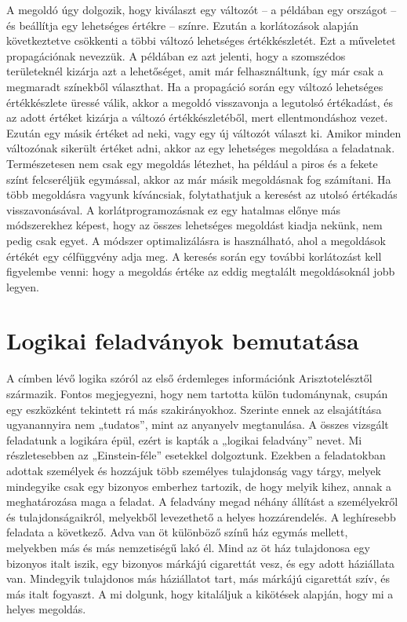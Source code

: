 \documentclass[12pt,a4paper,twoside, openright]{report}
\begin{document}
    A megoldó úgy dolgozik, hogy kiválaszt egy változót – a példában egy országot – és beállítja egy lehetséges értékre – színre.
    Ezután a korlátozások alapján következtetve csökkenti a többi változó lehetséges értékkészletét.
    Ezt a műveletet propagációnak nevezzük.
    A példában ez azt jelenti, hogy a szomszédos területeknél kizárja azt a lehetőséget, amit már felhasználtunk, így már csak a megmaradt színekből választhat.
    Ha a propagáció során egy változó lehetséges értékkészlete üressé válik, akkor a megoldó visszavonja a legutolsó értékadást, és az adott értéket kizárja a változó értékkészletéből, mert ellentmondáshoz vezet.
    Ezután egy másik értéket ad neki, vagy egy új változót választ ki.
    Amikor minden változónak sikerült értéket adni, akkor az egy lehetséges megoldása a feladatnak.
    Természetesen nem csak egy megoldás létezhet, ha például a piros és a fekete színt felcseréljük egymással, akkor az már másik megoldásnak fog számítani.
    Ha több megoldásra vagyunk kíváncsiak, folytathatjuk a keresést az utolsó értékadás visszavonásával.
    A korlátprogramozásnak ez egy hatalmas előnye más módszerekhez képest, hogy az összes lehetséges megoldást kiadja nekünk, nem pedig csak egyet.
    A módszer optimalizálásra is használható, ahol a megoldások értékét egy célfüggvény adja meg.
    A keresés során egy további korlátozást kell figyelembe venni: hogy a megoldás értéke az eddig megtalált megoldásoknál jobb legyen.


\section{Logikai feladványok bemutatása}

    A címben lévő logika szóról az első érdemleges információnk Arisztotelésztől származik.
    Fontos megjegyezni, hogy nem tartotta külön tudománynak, csupán egy eszközként tekintett rá más szakirányokhoz.
    Szerinte ennek az elsajátítása ugyanannyira nem „tudatos”, mint az anyanyelv megtanulása.\cite{logic}
    A összes vizsgált feladatunk a logikára épül, ezért is kapták a „logikai feladvány” nevet.
    Mi részletesebben az „Einstein-féle” esetekkel\cite{logicpuzzles} dolgoztunk.
    Ezekben a feladatokban adottak személyek és hozzájuk több személyes tulajdonság vagy tárgy, melyek mindegyike csak egy bizonyos emberhez tartozik, de hogy melyik kihez, annak a meghatározása maga a feladat.
    A feladvány megad néhány állítást a személyekről és tulajdonságaikról, melyekből levezethető a helyes hozzárendelés.
    A leghíresebb feladata a következő.
    Adva van öt különböző színű ház egymás mellett, melyekben más és más nemzetiségű lakó él.
    Mind az öt ház tulajdonosa egy bizonyos italt iszik, egy bizonyos márkájú cigarettát vesz, és egy adott háziállata van.
    Mindegyik tulajdonos más háziállatot tart, más márkájú cigarettát szív, és más italt fogyaszt.
    A mi dolgunk, hogy kitaláljuk a kikötések alapján, hogy mi a helyes megoldás.
\end{document}

